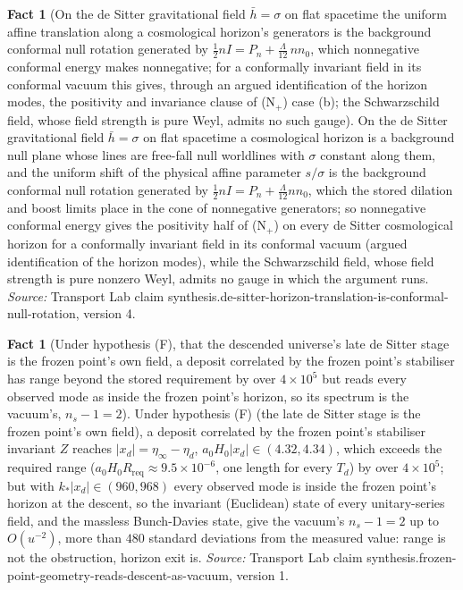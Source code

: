 \documentclass[11pt]{article}
\theoremstyle{definition}
\newtheorem{fact}[theorem]{Fact}
\theoremstyle{plain}
\providecommand{\hb}{}\renewcommand{\hb}{\bar{h}}
\providecommand{\nO}{}\renewcommand{\nO}{n_0}
\begin{document}
\begin{fact}[On the de Sitter gravitational field $\hb = \sigma$ on flat spacetime the uniform affine translation along a cosmological horizon's generators is the background conformal null rotation generated by $\tfrac12 nI = P_{n} + \tfrac{\Lambda}{12}\,n\nO$, which nonnegative conformal energy makes nonnegative; for a conformally invariant field in its conformal vacuum this gives, through an argued identification of the horizon modes, the positivity and invariance clause of (N$_{+}$) case (b); the Schwarzschild field, whose field strength is pure Weyl, admits no such gauge]\label{c:synthesis.de-sitter-horizon-translation-is-conformal-null-rotation}
On the de Sitter gravitational field $\hb = \sigma$ on flat spacetime a cosmological horizon is a background null plane whose lines are free-fall null worldlines with $\sigma$ constant along them, and the uniform shift of the physical affine parameter $s/\sigma$ is the background conformal null rotation generated by $\tfrac12 nI = P_{n} + \tfrac{\Lambda}{12}n\nO$, which the stored dilation and boost limits place in the cone of nonnegative generators; so nonnegative conformal energy gives the positivity half of (N$_{+}$) on every de Sitter cosmological horizon for a conformally invariant field in its conformal vacuum (argued identification of the horizon modes), while the Schwarzschild field, whose field strength is pure nonzero Weyl, admits no gauge in which the argument runs.
\emph{Source:} Transport Lab claim synthesis.de-sitter-horizon-translation-is-conformal-null-rotation, version 4.
\end{fact}

\begin{fact}[Under hypothesis (F), that the descended universe's late de Sitter stage is the frozen point's own field, a deposit correlated by the frozen point's stabiliser has range beyond the stored requirement by over $4 \times 10^{5}$ but reads every observed mode as inside the frozen point's horizon, so its spectrum is the vacuum's, $n_{s} - 1 = 2$]\label{c:synthesis.frozen-point-geometry-reads-descent-as-vacuum}
Under hypothesis (F) (the late de Sitter stage is the frozen point's own field), a deposit correlated by the frozen point's stabiliser invariant $Z$ reaches $|x_{d}| = \eta_{\infty} - \eta_{d}$, $a_{0}H_{0}|x_{d}| \in (4.32, 4.34)$, which exceeds the required range ($a_{0}H_{0}R_{\mathrm{req}} \approx 9.5 \times 10^{-6}$, one length for every $T_{d}$) by over $4 \times 10^{5}$; but with $k_{*}|x_{d}| \in (960, 968)$ every observed mode is inside the frozen point's horizon at the descent, so the invariant (Euclidean) state of every unitary-series field, and the massless Bunch-Davies state, give the vacuum's $n_{s} - 1 = 2$ up to $O(u^{-2})$, more than $480$ standard deviations from the measured value: range is not the obstruction, horizon exit is.
\emph{Source:} Transport Lab claim synthesis.frozen-point-geometry-reads-descent-as-vacuum, version 1.
\end{fact}
\end{document}
